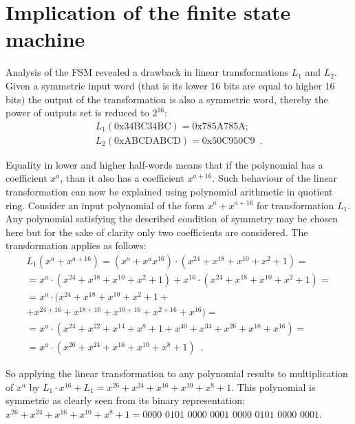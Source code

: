 \section{Implication of the finite state machine}
Analysis of the FSM revealed a drawback in linear transformations $L_1$ and
$L_2$. Given a symmetric input word (that is its lower 16 bits are equal to higher 16 bits)
the output of the transformation is also a symmetric word, thereby the power of
outputs set is reduced to $2^{16}$:
\begin{equation}
    \begin{array}{ll}
        L_1(\text{0x34BC34BC}) = \text{0x785A785A} ; \\
        L_2(\text{0xABCDABCD}) = \text{0x50C950C9} \enspace.
    \end{array}
\end{equation}

Equality in lower and higher half-words means that if the polynomial has a
coefficient $x^a$, than it also has a coefficient $x^{a + 16}$. Such behaviour of the linear
transformation can now be explained using polynomial arithmetic in quotient
ring. Consider an input polynomial of the form $x^a + x^{a+16}$ for
transformation $L_1$. Any
polynomial satisfying the described condition of symmetry may be chosen here
but for the sake of clarity only two coefficients are considered. The
transformation applies as follows:
\begin{equation}
    \label{eqn:zuc-symmetry}
	\begin{array}{ll}
        L_1(x^a + x^{a+16}) = (x^a + x^a x^16) \cdot (x^{24} + x^{18} + x^{10} + x^2 + 1) = \\
        = x^a \cdot (x^{24} + x^{18} + x^{10} + x^2 + 1) + x^{16} \cdot (x^{24} + x^{18} +x^{10} + x^2 +1) = \\
        = x^a \cdot (x^{24} + x^{18} + x^{10} + x^2 + 1 + \\
        + x^{24+16} + x^{18+16} + x^{10+16} + x^{2+16} + x^{16}) = \\
        = x^a \cdot (x^{24} + x^{22} + x^{14} + x^{8} + 1 + x^{40} + x^{34} + x^{26} + x^{18} + x^{16}) = \\
        = x^a \cdot (x^{26} + x^{24} + x^{16} + x^{10} + x^{8} + 1) \enspace .
	\end{array}
\end{equation}

So applying the linear transformation to any polynomial results to
multiplication of $x^a$ by 
$L_1 \cdot x^{16} + L_1 = x^{26} + x^{24} + x^{16} + x^{10} + x^{8} + 1$. 
This polynomial is symmetric as clearly seen from its
binary representation: 
$x^{26} + x^{24} + x^{16} + x^{10} + x^{8} + 1 = \text{0000 0101 0000 0001 0000 0101 0000 0001}$.

